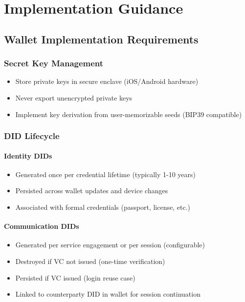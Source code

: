 \chapter{Implementation Guidance}

\section{Wallet Implementation Requirements}

\subsection{Secret Key Management}

\begin{itemize}
  \item Store private keys in secure enclave (iOS/Android hardware)
  \item Never export unencrypted private keys
  \item Implement key derivation from user-memorizable seeds (BIP39 compatible)
\end{itemize}

\subsection{DID Lifecycle}

\subsubsection{Identity DIDs}

\begin{itemize}
  \item Generated once per credential lifetime (typically 1-10 years)
  \item Persisted across wallet updates and device changes
  \item Associated with formal credentials (passport, license, etc.)
\end{itemize}

\subsubsection{Communication DIDs}

\begin{itemize}
  \item Generated per service engagement or per session (configurable)
  \item Destroyed if VC not issued (one-time verification)
  \item Persisted if VC issued (login reuse case)
  \item Linked to counterparty DID in wallet for session continuation
\end{itemize}

